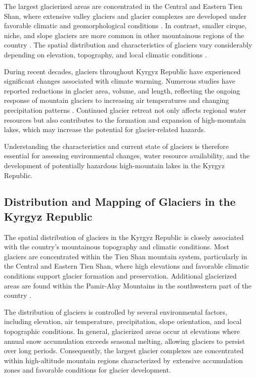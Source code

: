 \documentclass[12pt,a4paper]{report}
\begin{document}
The largest glacierized areas are concentrated in the Central and Eastern Tien Shan, where extensive valley glaciers and glacier complexes are developed under favorable climatic and geomorphological conditions \cite{chen2016,bolch2007}. In contrast, smaller cirque, niche, and slope glaciers are more common in other mountainous regions of the country \cite{bolch2007}. The spatial distribution and characteristics of glaciers vary considerably depending on elevation, topography, and local climatic conditions \cite{barry2006}. 

During recent decades, glaciers throughout Kyrgyz Republic have experienced significant changes associated with climate warming. Numerous studies have reported reductions in glacier area, volume, and length, reflecting the ongoing response of mountain glaciers to increasing air temperatures and changing precipitation patterns \cite{Aizen2006, Sorg2012}. Continued glacier retreat not only affects regional water resources but also contributes to the formation and expansion of high-mountain lakes, which may increase the potential for glacier-related hazards. 

Understanding the characteristics and current state of glaciers is therefore essential for assessing environmental changes, water resource availability, and the development of potentially hazardous high-mountain lakes in the Kyrgyz Republic.

\subsection{Distribution and Mapping of Glaciers in the Kyrgyz Republic}

The spatial distribution of glaciers in the Kyrgyz Republic is closely associated with the country’s mountainous topography and climatic conditions. Most glaciers are concentrated within the Tien Shan mountain system, particularly in the Central and Eastern Tien Shan, where high elevations and favorable climatic conditions support glacier formation and preservation. Additional glacierized areas are found within the Pamir-Alay Mountains in the southwestern part of the country \cite{Atlas2025}. 

The distribution of glaciers is controlled by several environmental factors, including elevation, air temperature, precipitation, slope orientation, and local topographic conditions. In general, glacierized areas occur at elevations where annual snow accumulation exceeds seasonal melting, allowing glaciers to persist over long periods. Consequently, the largest glacier complexes are concentrated within high-altitude mountain regions characterized by extensive accumulation zones and favorable conditions for glacier development. 
\end{document}
